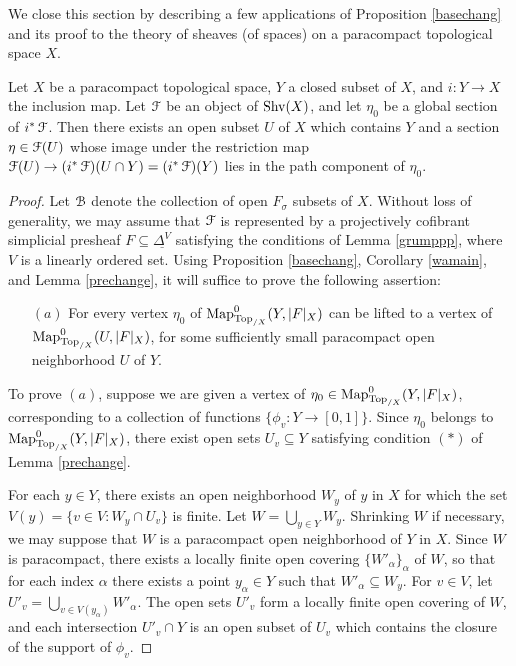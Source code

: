 We close this section by describing a few applications of Proposition \ref{basechang} and its proof to the theory of sheaves (of spaces) on a paracompact topological space $X$.

\begin{corollary}\label{hidebound}
Let $X$ be a paracompact topological space, $Y$ a closed subset of $X$, and $i: Y \rightarrow X$
the inclusion map. Let $\operatorname{\mathcal{F}}$ be an object of $\operatorname{Shv}(X)$, and let $\eta_0$ be a global section of
$i^{\ast} \operatorname{\mathcal{F}}$. Then there exists an open subset $U$ of $X$ which contains $Y$ and a section
$\eta \in \operatorname{\mathcal{F}}(U)$ whose image under the restriction map $\operatorname{\mathcal{F}}( U ) \rightarrow (i^{\ast} \operatorname{\mathcal{F}})(U \cap Y) = (i^{\ast} \operatorname{\mathcal{F}})(Y)$ lies in the path component of $\eta_0$.
\end{corollary}

\begin{proof}
Let $\operatorname{\mathcal{B}}$ denote the collection of open $F_{\sigma}$ subsets of $X$. Without loss of generality, we may assume that $\operatorname{\mathcal{F}}$ is represented by a projectively cofibrant simplicial presheaf
$F \subseteq \underline{ \Delta^{V} }$ satisfying the conditions of Lemma \ref{grumppp},
where $V$ is a linearly ordered set. Using Proposition \ref{basechang}, Corollary \ref{wamain}, and 
Lemma \ref{prechange}, it will suffice to prove the following assertion:
\begin{itemize}
\item[$(a)$] For every vertex $\eta_0$ of $\operatorname{{Map}}^{0}_{\operatorname{Top}_{/X}}( Y, |F|_X)$ can be
lifted to a vertex of $\operatorname{{Map}}^{0}_{ \operatorname{Top}_{/X}}(U, |F|_X)$, for some sufficiently small
paracompact open neighborhood $U$ of $Y$.
\end{itemize}
To prove $(a)$, suppose we are given a vertex of
$\eta_0 \in \operatorname{{Map}}^{0}_{\operatorname{Top}_{/X}}( Y, |F|_X)$, corresponding to a collection of functions
$\{ \phi_v: Y \rightarrow [0,1] \}$. Since $\eta_0$ belongs to
$\operatorname{{Map}}^{0}_{\operatorname{Top}_{/X}}(Y, |F|_X)$, there exist open sets
$U_v \subseteq Y$ satisfying condition $(\ast)$ of Lemma \ref{prechange}.

For each $y \in Y$, there exists an open neighborhood $W_y$ of $y$ in $X$ for which the
set $V(y) = \{ v \in V: W_y \cap U_v \}$ is finite. Let $W = \bigcup_{y \in Y} W_y$.
Shrinking $W$ if necessary, we may suppose that $W$ is a paracompact open neighborhood of $Y$
in $X$. Since $W$ is paracompact, there exists a locally finite open covering
$\{ W'_{\alpha} \}_{\alpha}$ of $W$, so that for each index $\alpha$ there exists a point
$y_{\alpha} \in Y$ such that $W'_{\alpha} \subseteq W_{y}$. For $v \in V$, let
$U'_{v} = \bigcup_{v \in V(y_{\alpha})} W'_{\alpha}$. The open sets
$U'_{v}$ form a locally finite open covering of $W$, and each intersection
$U'_{v} \cap Y$ is an open subset of $U_{v}$ which contains the closure of the support
of $\phi_{v}$.


\end{proof}
